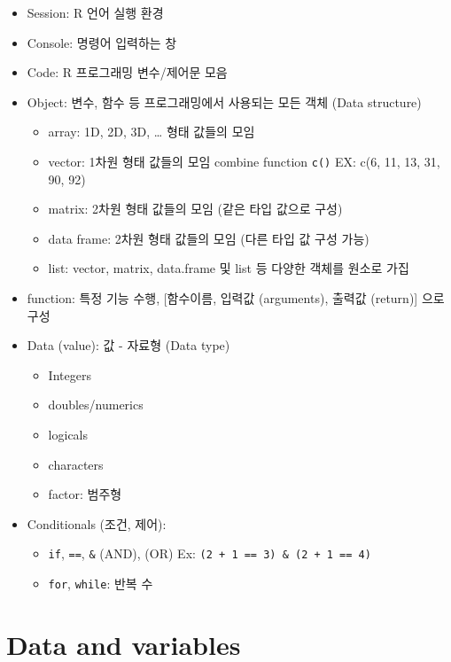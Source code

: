 \documentclass[
  a4paper,
]{book}
\providecommand{\tightlist}{%
  \setlength{\itemsep}{0pt}\setlength{\parskip}{0pt}}\usepackage{longtable,booktabs,array}
\begin{document}
\begin{itemize}
\tightlist
\item
  Session: R 언어 실행 환경
\item
  Console: 명령어 입력하는 창
\item
  Code: R 프로그래밍 변수/제어문 모음
\item
  Object: 변수, 함수 등 프로그래밍에서 사용되는 모든 객체 (Data
  structure)

  \begin{itemize}
  \tightlist
  \item
    array: 1D, 2D, 3D, \ldots{} 형태 값들의 모임
  \item
    vector: 1차원 형태 값들의 모임 combine function \texttt{c()} EX:
    c(6, 11, 13, 31, 90, 92)
  \item
    matrix: 2차원 형태 값들의 모임 (같은 타입 값으로 구성)
  \item
    data frame: 2차원 형태 값들의 모임 (다른 타입 값 구성 가능)
  \item
    list: vector, matrix, data.frame 및 list 등 다양한 객체를 원소로
    가집
  \end{itemize}
\item
  function: 특정 기능 수행, {[}함수이름, 입력값 (arguments), 출력값
  (return){]} 으로 구성
\item
  Data (value): 값 - 자료형 (Data type)

  \begin{itemize}
  \tightlist
  \item
    Integers
  \item
    doubles/numerics
  \item
    logicals
  \item
    characters
  \item
    factor: 범주형
  \end{itemize}
\item
  Conditionals (조건, 제어):

  \begin{itemize}
  \tightlist
  \item
    \texttt{if}, \texttt{==}, \texttt{\&} (AND), \texttt{\textbar{}}
    (OR) Ex: \texttt{(2\ +\ 1\ ==\ 3)\ \&\ (2\ +\ 1\ ==\ 4)}
  \item
    \texttt{for}, \texttt{while}: 반복 수
  \end{itemize}
\end{itemize}

\hypertarget{data-and-variables}{%
\section{Data and variables}\label{data-and-variables}}
\end{document}
